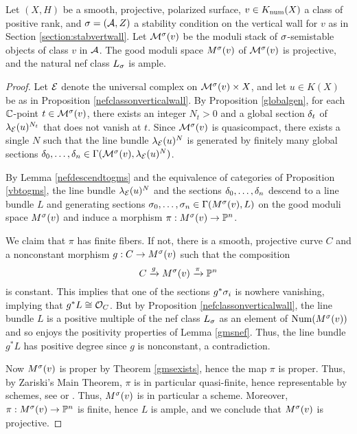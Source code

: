 \begin{thm}\label{projectivity}
    Let $(X, H)$ be a smooth, projective, polarized surface, $v \in K_{\mathrm{num}}(X)$ a class of positive rank, and $\sigma = (\mathcal{A}, Z)$ a stability condition on the vertical wall for $v$ as in Section \ref{section:stabvertwall}. Let $\mathcal{M}^\sigma(v)$ be the moduli stack of $\sigma$-semistable objects of class $v$ in $\mathcal{A}$. The good moduli space $M^\sigma(v)$ of $\mathcal{M}^\sigma(v)$ is projective, and the natural nef class $L_\sigma$ is ample.
\end{thm}
\begin{proof}
    Let $\mathcal{E}$ denote the universal complex on $\mathcal{M}^\sigma(v) \times X$, and let $u \in K(X)$ be as in Proposition \ref{nefclassonverticalwall}. By Proposition \ref{globalgen}, for each $\mathbb{C}$-point $t \in \mathcal{M}^\sigma(v)$, there exists an integer $N_t > 0$ and a global section $\delta_t$ of $\lambda_{\mathcal{E}}(u)^{N_t}$ that does not vanish at $t$. Since $\mathcal{M}^\sigma(v)$ is quasicompact, there exists a single $N$ such that the line bundle $\lambda_{\mathcal{E}}(u)^N$ is generated by finitely many global sections $\delta_0,\ldots,\delta_n \in \Gamma(\mathcal{M}^\sigma(v), \lambda_{\mathcal{E}}(u)^N)$. 
    
    By Lemma \ref{nefdescendtogms} and the equivalence of categories of Proposition \ref{vbtogms}, the line bundle $\lambda_{\mathcal{E}}(u)^N$ and the sections $\delta_0,\ldots,\delta_n$ descend to a line bundle $L$ and generating sections $\sigma_0,\ldots,\sigma_n \in \Gamma(M^\sigma(v), L)$ on the good moduli space $M^\sigma(v)$ and induce a morphism $\pi: M^\sigma(v) \to \mathbb{P}^n$.
    
    We claim that $\pi$ has finite fibers. If not, there is a smooth, projective curve $C$ and a nonconstant morphism $g: C \to M^\sigma(v)$ such that the composition 
    \[ C \xrightarrow{g} M^\sigma(v) \xrightarrow{\pi} \mathbb{P}^n \]
    is constant. This implies that one of the sections $g^*\sigma_i$ is nowhere vanishing, implying that $g^*L \cong \mathcal{O}_C$. But by Proposition \ref{nefclassonverticalwall}, the line bundle $L$ is a positive multiple of the nef class $L_\sigma$ as an element of $\mathrm{Num}(M^\sigma(v))$ and so enjoys the positivity properties of Lemma \ref{gmsnef}. Thus, the line bundle $g^*L$ has positive degree since $g$ is nonconstant, a contradiction.
    
    Now $M^\sigma(v)$ is proper by Theorem \ref{gmsexists}, hence the map $\pi$ is proper. Thus, by Zariski's Main Theorem, $\pi$ is in particular quasi-finite, hence representable by schemes, see \cite[Chapter II, Theorem 6.15]{knutson} or \cite[\href{https://stacks.math.columbia.edu/tag/082J}{Tag 082J}]{stacks-project}. Thus, $M^\sigma(v)$ is in particular a scheme. Moreover, $\pi: M^\sigma(v) \to \mathbb{P}^n$ is finite, hence $L$ is ample, and we conclude that $M^\sigma(v)$ is projective.
\end{proof}

